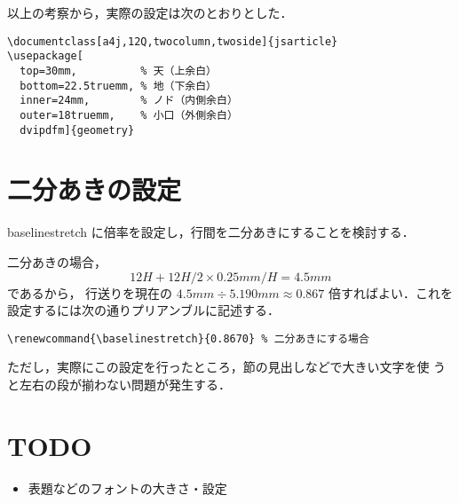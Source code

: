 \documentclass[a4j, 12Q, twocolumn, twoside]{jsarticle}
\begin{document}
  以上の考察から，実際の設定は次のとおりとした．

{\small
\begin{verbatim}
\documentclass[a4j,12Q,twocolumn,twoside]{jsarticle}
\usepackage[
  top=30mm,          % 天（上余白）
  bottom=22.5truemm, % 地（下余白）
  inner=24mm,        % ノド（内側余白）
  outer=18truemm,    % 小口（外側余白）
  dvipdfm]{geometry}
\end{verbatim}
}

\section{二分あきの設定}
  baselinestretch に倍率を設定し，行間を二分あきにすることを検討する．
  
  二分あきの場合，
  \[ 12H + 12H/2 \times 0.25mm/H= 4.5mm\]であるから，
  行送りを現在の
  $4.5mm \div 5.190mm \approx 0.867$
  倍すればよい．これを設定するには次の通りプリアンブルに記述する．

{\small
\begin{verbatim}
\renewcommand{\baselinestretch}{0.8670} % 二分あきにする場合
\end{verbatim}
}

  ただし，実際にこの設定を行ったところ，節の見出しなどで大きい文字を使
  うと左右の段が揃わない問題が発生する．
\section{TODO}
\begin{itemize}
 \item 表題などのフォントの大きさ・設定
\end{itemize}
\end{document}
